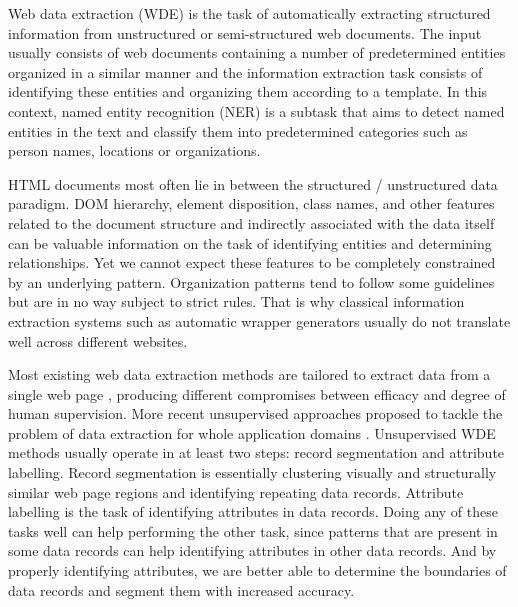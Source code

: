 \documentclass[sigconf]{acmart}
\begin{document}
Web data extraction (WDE) is the task of automatically extracting structured information
from unstructured or semi-structured web documents. The input usually consists of
web documents containing a number of predetermined entities organized in a similar 
manner and the information extraction task consists of identifying these entities
and organizing them according to a template. In this context, named entity recognition
(NER) is a subtask that aims to detect named entities in the text and classify them into 
predetermined categories such as person names, locations or organizations. 

HTML documents most often lie in between the structured / unstructured data paradigm.
DOM hierarchy, element disposition, class names, and other features related to 
the document structure and indirectly associated with the data itself can be valuable 
information on the task of identifying entities and determining relationships. Yet we 
cannot expect these features to be completely constrained by an underlying pattern. 
Organization patterns tend to follow some guidelines but are in no way subject to 
strict rules. That is why classical information extraction systems such as automatic
wrapper generators usually do not translate well across different websites. 

Most existing web data extraction methods are tailored to extract data from a single
web page \cite{Crescenzi2001, Arasu2003, Freitag1998, Califf1999, Soderland1999,
Kushmerick2000, Hsu1998, Muslea1999}, producing different compromises between efficacy
and degree of human supervision. More recent unsupervised approaches proposed to
tackle the problem of data extraction for whole application domains \cite{Zhu2005, Zhu2006, 
Abdessalem2010, Furche2012, Furche2012a}. Unsupervised WDE methods usually operate in at
least two steps: record segmentation and attribute labelling. Record segmentation
is essentially clustering visually and structurally similar web page regions and 
identifying repeating data records. Attribute labelling is the task of identifying
attributes in data records. Doing any of these tasks well can help performing the 
other task, since patterns that are present in some data records can help identifying 
attributes in other data records. And by properly identifying attributes, we are better 
able to determine the boundaries of data records and segment them with increased accuracy.
\end{document}
